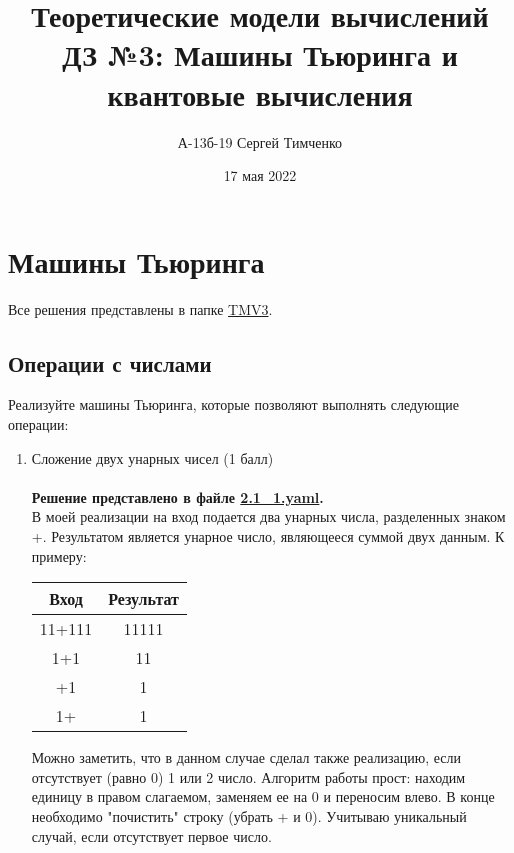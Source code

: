 \documentclass{article}
\title{Теоретические модели вычислений \\ ДЗ №3: Машины Тьюринга и квантовые вычисления}
\author{А-13б-19 Сергей Тимченко}
\date{17 мая 2022}
\begin{document}
\maketitle

\section{Машины Тьюринга}
Все решения представлены в папке \href{https://github.com/NRU-MPEI-IMAI/tm-and-qc-s3tout/tree/main/TMV3}{TMV3}. 
\subsection{Операции с числами}

Реализуйте машины Тьюринга, которые позволяют выполнять следующие операции:
\begin{enumerate}
    \item Сложение двух унарных чисел (1 балл) \\ \\
    \textbf{Решение представлено в файле \href{https://github.com/NRU-MPEI-IMAI/tm-and-qc-s3tout/blob/main/TMV3/2.1_1.yaml}{2.1\_1.yaml}.} \\
    В моей реализации на вход подается два унарных числа, разделенных знаком +. Результатом является унарное число, являющееся суммой двух данным. 
    К примеру: 
    \begin{center}
        \begin{tabular}{c|c}
        Вход    & Результат     \\ \hline
        11+111  & 11111         \\
        1+1     & 11            \\
        +1      & 1             \\
        1+      & 1
    \end{tabular}
    \end{center}
    Можно заметить, что в данном случае сделал также реализацию, если отсутствует (равно 0) 1 или 2 число. Алгоритм работы прост: находим единицу в правом слагаемом, заменяем ее на 0 и переносим влево. В конце необходимо "почистить" строку (убрать + и 0). Учитываю уникальный случай, если отсутствует первое число. 
    

\end{enumerate}
\end{document}
